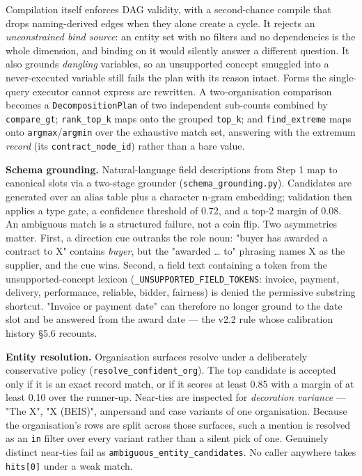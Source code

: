 \documentclass[10pt]{article} %
\begin{document}
Compilation itself enforces DAG validity, with a second-chance compile that drops naming-derived edges when they alone create a cycle. It rejects an \emph{unconstrained bind source}: an entity set with no filters and no dependencies is the whole dimension, and binding on it would silently answer a different question. It also grounds \emph{dangling} variables, so an unsupported concept smuggled into a never-executed variable still fails the plan with its reason intact. Forms the single-query executor cannot express are rewritten. A two-organisation comparison becomes a \texttt{DecompositionPlan} of two independent sub-counts combined by \texttt{compare\_gt}; \texttt{rank\_top\_k} maps onto the grouped \texttt{top\_k}; and \texttt{find\_extreme} maps onto \texttt{argmax}/\texttt{argmin} over the exhaustive match set, answering with the extremum \emph{record} (its \texttt{contract\_node\_id}) rather than a bare value.

\textbf{Schema grounding.} Natural-language field descriptions from Step 1 map to canonical slots via a two-stage grounder (\texttt{schema\_grounding.py}). Candidates are generated over an alias table plus a character n-gram embedding; validation then applies a type gate, a confidence threshold of 0.72, and a top-2 margin of 0.08. An ambiguous match is a structured failure, not a coin flip. Two asymmetries matter. First, a direction cue outranks the role noun: "buyer has awarded a contract to X" contains \emph{buyer}, but the "awarded \ldots{} to" phrasing names X as the supplier, and the cue wins. Second, a field text containing a token from the unsupported-concept lexicon (\texttt{\_UNSUPPORTED\_FIELD\_TOKENS}: invoice, payment, delivery, performance, reliable, bidder, fairness) is denied the permissive substring shortcut. "Invoice or payment date" can therefore no longer ground to the date slot and be answered from the award date --- the v2.2 rule whose calibration history \S5.6 recounts.

\textbf{Entity resolution.} Organisation surfaces resolve under a deliberately conservative policy (\texttt{resolve\_confident\_org}). The top candidate is accepted only if it is an exact record match, or if it scores at least 0.85 with a margin of at least 0.10 over the runner-up. Near-ties are inspected for \emph{decoration variance} --- "The X", "X (BEIS)", ampersand and case variants of one organisation. Because the organisation's rows are split across those surfaces, such a mention is resolved as an \texttt{in} filter over every variant rather than a silent pick of one. Genuinely distinct near-ties fail as \texttt{ambiguous\_entity\_candidates}. No caller anywhere takes \texttt{hits[0]} under a weak match.
\end{document}
